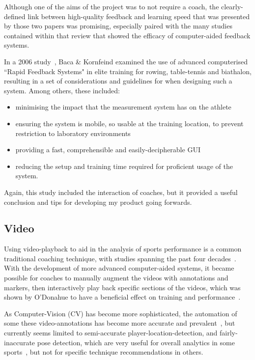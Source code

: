 Although one of the aims of the project was to not require a coach, the clearly-defined link between high-quality feedback and learning speed that was presented by those two papers was promising, especially paired with the many studies contained within that review that showed the efficacy of computer-aided feedback systems.

In a 2006 study~\cite{bacafeedback}, Baca \& Kornfeind examined the use of advanced computerised ``Rapid Feedback Systems" in elite training for rowing, table-tennis and biathalon, resulting in a set of considerations and guidelines for when designing such a system.
Among others, these included:
\begin{itemize}
    \item minimising the impact that the measurement system has on the athlete
    \item ensuring the system is mobile, so usable at the training location, to prevent restriction to laboratory environments
    \item providing a fast, comprehensible and easily-decipherable GUI
    \item reducing the setup and training time required for proficient usage of the system.
\end{itemize}

Again, this study included the interaction of coaches, but it provided a useful conclusion and tips for developing my product going forwards.

\subsection{Video}
Using video-playback to aid in the analysis of sports performance is a common traditional coaching technique, with studies spanning the past four decades~\cite{sportperformance86, groomcoachperceptions, groomvideo}.
With the development of more advanced computer-aided systems, it became possible for coaches to manually augment the videos with annotations and markers\cite{kinovea}, then interactively play back specific sections of the videos, which was shown by O'Donahue to have a beneficial effect on training and performance~\cite{odonovideo}.

As Computer-Vision (CV) has become more sophisticated, the automation of some these video-annotations has become more accurate and prevalent~\cite{cvinsport}, but currently seems limited to semi-accurate player-location-detection, and fairly-inaccurate pose detection, which are very useful for overall analytics in some sports~\cite{pansiottenniscv}, but not for specific technique recommendations in others.

